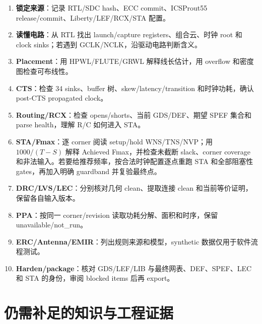 \documentclass[UTF8,a4paper,11pt,fontset=fandol]{ctexart}
\numberwithin{equation}{section}
\begin{document}
\begin{enumerate}
  \item \textbf{锁定来源}：记录 RTL/SDC hash、ECC commit、ICSProut55 release/commit、Liberty/LEF/RCX/STA 配置。
  \item \textbf{读懂电路}：从 RTL 找出 launch/capture registers、组合云、时钟 root 和 clock sinks；若遇到 GCLK/NCLK，沿驱动电路判断含义。
  \item \textbf{Placement}：用 HPWL/FLUTE/GRWL 解释线长估计，用 overflow 和密度图检查可布线性。
  \item \textbf{CTS}：检查 34 sinks、buffer 树、skew/latency/transition 和时钟功耗，确认 post-CTS propagated clock。
  \item \textbf{Routing/RCX}：检查 opens/shorts、当前 GDS/DEF、期望 SPEF 集合和 parse health，理解 R/C 如何进入 STA。
  \item \textbf{STA/Fmax}：逐 corner 阅读 setup/hold WNS/TNS/NVP；用 $1000/(T-S)$ 解释 Achieved Fmax，并检查未截断 slack、corner coverage 和非法输入。若要给推荐频率，按合法时钟配置逐点重跑 STA 和全部阻塞性 gates，再加入明确 guardband 并复验最终点。
  \item \textbf{DRC/LVS/LEC}：分别核对几何 clean、提取连接 clean 和当前等价证明，保留各自输入版本。
  \item \textbf{PPA}：按同一 corner/revision 读取功耗分解、面积和时序，保留 unavailable/not\_run。
  \item \textbf{ERC/Antenna/EMIR}：列出规则来源和模型，synthetic 数据仅用于软件流程测试。
  \item \textbf{Harden/package}：核对 GDS/LEF/LIB 与最终网表、DEF、SPEF、LEC 和 STA 的身份，审阅 blocked items 后再 export。
\end{enumerate}

\section{仍需补足的知识与工程证据}
\end{document}
